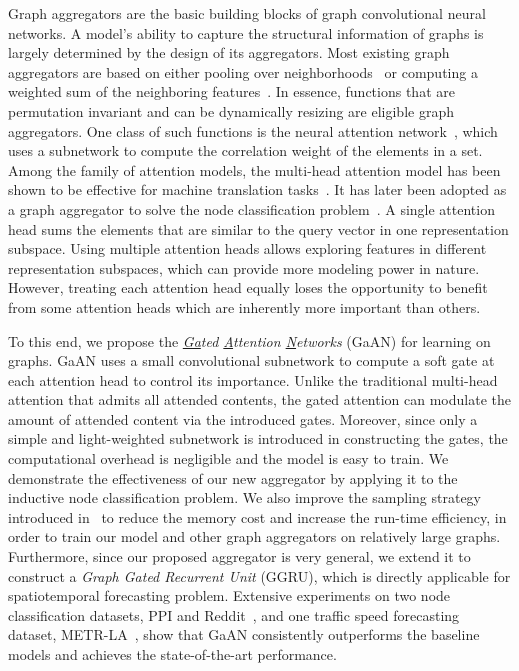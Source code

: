 \documentclass{article}
\begin{document}
	Graph aggregators are the basic building blocks of graph convolutional neural networks. A model's ability to capture the structural information of graphs is largely determined by the design of its aggregators. Most existing graph aggregators are based on either pooling over neighborhoods~\citep{kipf2017semi, hamilton2017inductive} or computing a weighted sum of the neighboring features~\citep{monti2017geometric}. In essence, functions that are permutation invariant and can be dynamically resizing are eligible graph aggregators. One class of such functions is the neural attention network~\citep{bahdanau2014neural}, which uses a subnetwork to compute the correlation weight of the elements in a set. Among the family of attention models, the multi-head attention model has been shown to be effective for machine translation tasks~\citep{lin2017structured,vaswani2017attention}. It has later been adopted as a graph aggregator to solve the node classification problem~\citep{velivckovic2017graph}. 
	A single attention head sums the elements that are similar to the query vector in one representation subspace. Using multiple attention heads allows exploring features in different representation subspaces, which can provide more modeling power in nature. However, treating each attention head equally loses the opportunity to benefit from some attention heads which are inherently more important than others.
	
	To this end, we propose the \emph{\underline{Ga}ted \underline{A}ttention \underline{N}etworks} (GaAN) for learning on graphs. GaAN uses a small convolutional subnetwork to compute a soft gate at each attention head to control its importance. 
	Unlike the traditional multi-head attention that admits all attended contents, the gated attention can modulate the amount of attended content via the introduced gates. Moreover, since only a simple and light-weighted subnetwork is introduced in constructing the gates, the computational overhead is negligible and the model is easy to train. We demonstrate the effectiveness of our new aggregator by applying it to the inductive node classification problem. We also improve the sampling strategy introduced in~\citep{hamilton2017inductive} to reduce the memory cost and increase the run-time efficiency, in order to train our model and other graph aggregators on relatively large graphs. Furthermore, since our proposed aggregator is very general, we extend it to construct a \emph{Graph Gated Recurrent Unit} (GGRU), which is directly applicable for spatiotemporal forecasting problem. Extensive experiments on two node classification datasets, PPI and Reddit~\citep{hamilton2017inductive}, and one traffic speed forecasting dataset, METR-LA~\citep{li2017graph}, show that GaAN consistently outperforms the baseline models and achieves the state-of-the-art performance.
	
\end{document}
